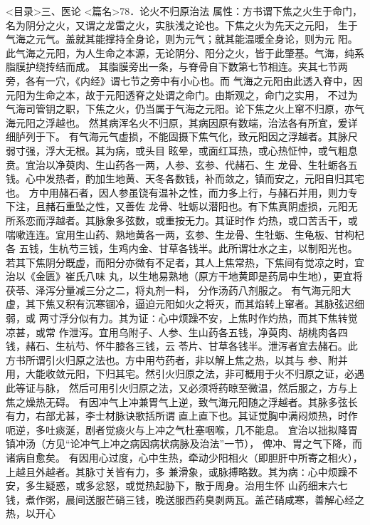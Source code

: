 \documentclass[a4paper,12pt,UTF8,twoside]{ctexbook}
\begin{document}
<目录>三、医论
<篇名>78．论火不归原治法
属性：方书谓下焦之火生于命门，名为阴分之火，又谓之龙雷之火，实肤浅之论也。下焦之火为先天之元阳， 
生于气海之元气。盖就其能撑持全身论，则为元气；就其能温暖全身论，则为元 
阳。此气海之元阳，为人生命之本源，无论阴分、阳分之火，皆于此肇基。气海，纯系脂膜护绕抟结而成。 
其脂膜旁出一条，与脊骨自下数第七节相连。夹其七节两旁，各有一穴，《内经》谓七节之旁中有小心也。而 
气海之元阳由此透入脊中，因元阳为生命之本，故于元阳透脊之处谓之命门。由斯观之，命门之实用， 
不过为气海司管钥之职，下焦之火，仍当属于气海之元阳。论下焦之火上窜不归原，亦气海元阳之浮越也。 
然其病浑名火不归原，其病因原有数端，治法各有所宜，爰详细胪列于下。 
有气海元气虚损，不能固摄下焦气化，致元阳因之浮越者。其脉尺弱寸强，浮大无根。其为病，或头目 
眩晕，或面红耳热，或心热怔忡，或气粗息贲。宜治以净萸肉、生山药各一两，人参、玄参、代赭石、生 
龙骨、生牡蛎各五钱。心中发热者，酌加生地黄、天冬各数钱，补而敛之，镇而安之，元阳自归其宅也。 
方中用赭石者，因人参虽饶有温补之性，而力多上行，与赭石并用，则力专下注，且赭石重坠之性，又善佐 
龙骨、牡蛎以潜阳也。有下焦真阴虚损，元阳无所系恋而浮越者。其脉象多弦数，或重按无力。其证时作 
灼热，或口苦舌干，或喘嗽连连。宜用生山药、熟地黄各一两，玄参、生龙骨、生牡蛎、生龟板、甘枸杞各 
五钱，生杭芍三钱，生鸡内金、甘草各钱半。此所谓壮水之主，以制阳光也。 
若其下焦阴分既虚，而阳分亦微有不足者，其人上焦常热，下焦间有觉凉之时，宜治以《金匮》崔氏八味 
丸，以生地易熟地（原方干地黄即是药局中生地），更宜将茯苓、泽泻分量减三分之二，将丸剂一料， 
分作汤药八剂服之。 
有气海元阳大虚，其下焦又积有沉寒锢冷，逼迫元阳如火之将灭，而其焰转上窜者。其脉弦迟细弱，或 
两寸浮分似有力。其为证∶心中烦躁不安，上焦时作灼热，而其下焦转觉凉甚，或常 
作泄泻。宜用乌附子、人参、生山药各五钱，净萸肉、胡桃肉各四钱，赭石、生杭芍、怀牛膝各三钱，云 
苓片、甘草各钱半。泄泻者宜去赭石。此方书所谓引火归原之法也。方中用芍药者，非以解上焦之热，以其与 
参、附并用，大能收敛元阳，下归其宅。然引火归原之法，非可概用于火不归原之证，必遇此等证与脉， 
然后可用引火归原之法，又必须将药晾至微温，然后服之，方与上焦之燥热无碍。 
有因冲气上冲兼胃气上逆，致气海元阳随之浮越者。其脉多弦长有力，右部尤甚，李士材脉诀歌括所谓 
直上直下也。其证觉胸中满闷烦热，时作呃逆，多吐痰涎，剧者觉痰火与上冲之气杜塞咽喉，几不能息。 
宜治以拙拟降胃镇冲汤（方见“论冲气上冲之病因病状病脉及治法”一节）， 
俾冲、胃之气下降，而诸病自愈矣。 
有因用心过度，心中生热，牵动少阳相火（即胆肝中所寄之相火），上越且外越者。其脉寸关皆有力，多 
兼滑象，或脉搏略数。其为病∶心中烦躁不安，多生疑惑，或多忿怒，或觉热起胁下，散于周身。治用生怀 
山药细末六七钱，煮作粥，晨间送服芒硝三钱，晚送服西药臭剥两瓦。盖芒硝咸寒，善解心经之热，以开心 
\end{document}
